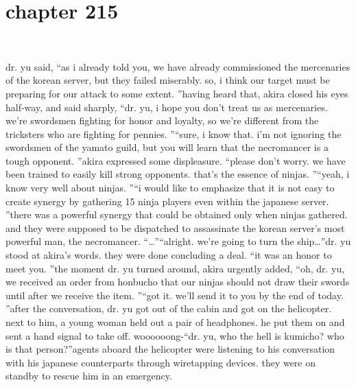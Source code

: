 \section{chapter 215}

                             




dr.
 yu said, “as i already told you, we have already commissioned the mercenaries of the korean server, but they failed miserably.
 so, i think our target must be preparing for our attack to some extent.
”having heard that, akira closed his eyes half-way, and said sharply, “dr.
 yu, i hope you don’t treat us as mercenaries.
 we’re swordsmen fighting for honor and loyalty, so we’re different from the tricksters who are fighting for pennies.
”“sure, i know that.
 i’m not ignoring the swordsmen of the yamato guild, but you will learn that the necromancer is a tough opponent.
”akira expressed some displeasure.
“please don’t worry.
 we have been trained to easily kill strong opponents.
 that’s the essence of ninjas.
”“yeah, i know very well about ninjas.
”“i would like to emphasize that it is not easy to create synergy by gathering 15 ninja players even within the japanese server.
”there was a powerful synergy that could be obtained only when ninjas gathered.
 and they were supposed to be dispatched to assassinate the korean server’s most powerful man, the necromancer.
“…”“alright.
 we’re going to turn the ship…”dr.
 yu stood at akira’s words.
 they were done concluding a deal.
“it was an honor to meet you.
”the moment dr.
 yu turned around, akira urgently added, “oh, dr.
 yu, we received an order from honbucho that our ninjas should not draw their swords until after we receive the item.
”“got it.
 we’ll send it to you by the end of today.
”after the conversation, dr.
 yu got out of the cabin and got on the helicopter.
 next to him, a young woman held out a pair of headphones.
 he put them on and sent a hand signal to take off.
woooooong-“dr.
 yu, who the hell is kumicho? who is that person?”agents aboard the helicopter were listening to his conversation with his japanese counterparts through wiretapping devices.
 they were on standby to rescue him in an emergency.

